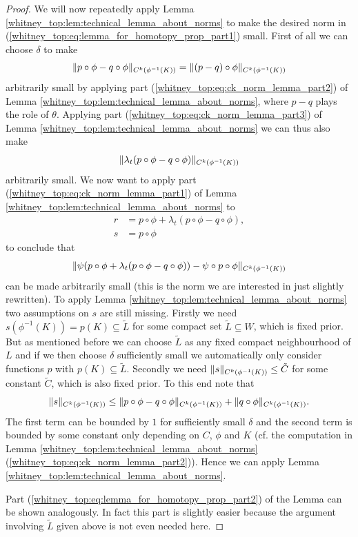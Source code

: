 \begin{proof}
    We will now repeatedly apply Lemma \ref{whitney_top:lem:technical_lemma_about_norms} to make the desired norm in (\ref{whitney_top:eq:lemma_for_homotopy_prop_part1}) small. First of all we can choose $\delta$ to make 
    \[
    \lVert p \circ \phi - q \circ \phi\rVert_{C^k(\phi^{-1}(K))} = \lVert(p-q) \circ \phi\rVert_{C^k(\phi^{-1}(K))} 
    \]
    arbitrarily small by applying part (\ref{whitney_top:eq:ck_norm_lemma_part2}) of Lemma \ref{whitney_top:lem:technical_lemma_about_norms}, where $p-q$ plays the role of $\theta$. Applying part (\ref{whitney_top:eq:ck_norm_lemma_part3}) of Lemma \ref{whitney_top:lem:technical_lemma_about_norms} we can thus also make 
    \[
    \lVert\lambda_t (p \circ \phi - q \circ \phi)\rVert_{C^k(\phi^{-1}(K))}
    \]
    arbitrarily small. We now want to apply part (\ref{whitney_top:eq:ck_norm_lemma_part1}) of Lemma \ref{whitney_top:lem:technical_lemma_about_norms} to 
    \begin{align*}
        r &= p \circ \phi + \lambda_t (p \circ \phi - q \circ \phi), \\
        s &= p \circ \phi
    \end{align*}
    to conclude that 
    \[
    \lVert\psi(p \circ \phi + \lambda_t (p \circ \phi - q \circ \phi)) - \psi \circ p \circ \phi\rVert_{C^k(\phi^{-1}(K))}
    \]
    can be made arbitrarily small (this is the norm we are interested in just slightly rewritten). To apply Lemma \ref{whitney_top:lem:technical_lemma_about_norms} two assumptions on $s$ are still missing. Firstly we need $s(\phi^{-1}(K)) = p(K)\subseteq \tilde{L}$ for some compact set $\tilde{L} \subseteq W$, which is fixed prior. But as mentioned before we can choose $\tilde{L}$ as any fixed compact neighbourhood of $L$ and if we then choose $\delta$ sufficiently small we automatically only consider functions $p$ with $p(K) \subseteq \tilde{L}$. Secondly we need $\lVert s\rVert_{C^k(\phi^{-1}(K))} \leq \tilde{C}$ for some constant $\tilde{C}$, which is also fixed prior. To this end note that 
    \[
    \lVert s\rVert_{C^k(\phi^{-1}(K))} \leq \lVert p \circ \phi - q \circ \phi\rVert_{C^k(\phi^{-1}(K))} + \lVert q \circ \phi\rVert_{C^k(\phi^{-1}(K))}.
    \] 
    The first term can be bounded by $1$ for sufficiently small $\delta$ and the second term is bounded by some constant only depending on $C$, $\phi$ and $K$ (cf. the computation in Lemma \ref{whitney_top:lem:technical_lemma_about_norms}  (\ref{whitney_top:eq:ck_norm_lemma_part2})). Hence we can apply Lemma \ref{whitney_top:lem:technical_lemma_about_norms}.
    
    Part (\ref{whitney_top:eq:lemma_for_homotopy_prop_part2}) of the Lemma can be shown analogously. In fact this part is slightly easier because the argument involving $\tilde{L}$ given above is not even needed here.
\end{proof}

